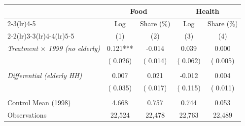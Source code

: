 \begin{tabular}{lcccc} \hline \hline
& \multicolumn{2}{c}{Food} & \multicolumn{2}{c}{Health} \\ 
\cmidrule(lr){2-3}\cmidrule(lr){4-5}
& \multicolumn{1}{c}{Log} & \multicolumn{1}{c}{Share (\%)} & \multicolumn{1}{c}{Log} & \multicolumn{1}{c}{Share (\%)} \\ 
\cmidrule(lr){2-2}\cmidrule(lr){3-3}\cmidrule(lr){4-4}\cmidrule(lr){5-5}
& \multicolumn{1}{c}{(1)} & \multicolumn{1}{c}{(2)} & \multicolumn{1}{c}{(3)} & \multicolumn{1}{c}{(4)} \\ \toprule
\textit{Treatment $\times$ 1999 (no elderly)} & 0.121*** & -0.014 & 0.039 & 0.000 \\ 
 & (    0.026) & (    0.014) & (    0.062) & (    0.005) \\ 
  & & & & \\ 
\textit{Differential (elderly HH)} & 0.007 & 0.021 & -0.012 & 0.004 \\ 
 & (    0.035) & (    0.017) & (    0.115) & (    0.011) \\ 
  & & & & \\ 
Control Mean (1998) &     4.668 &     0.757 &     0.744 &     0.053 \\ 
Observations &       22,524 &       22,478 &       22,763 &       22,489 \\ \bottomrule
\end{tabular}